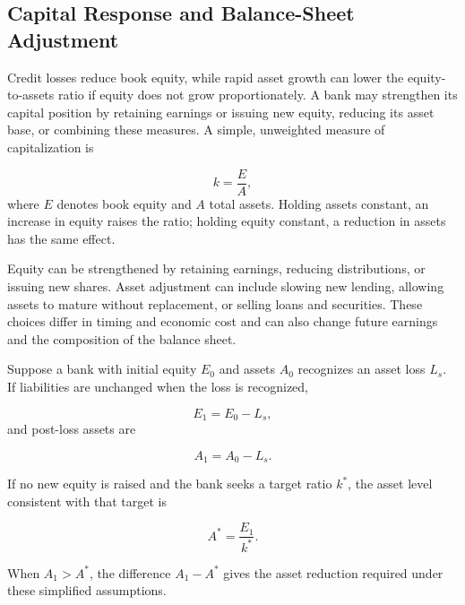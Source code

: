 \subsection[Capital Response and Balance-Sheet Adjustment]
{Capital Response and Balance-Sheet Adjustment}

Credit losses reduce book equity, while rapid asset growth
can lower the equity-to-assets ratio if equity does not grow
proportionately. A bank may strengthen its capital position
by retaining earnings or issuing new equity, reducing its
asset base, or combining these measures. A simple,
unweighted measure of capitalization is

\begin{equation}
k=\frac{E}{A},
\end{equation}
where $E$ denotes book equity and $A$ total assets.
Holding assets constant, an increase in equity raises the
ratio; holding equity constant, a reduction in assets has
the same effect.

Equity can be strengthened by retaining earnings, reducing distributions, or issuing new shares. Asset adjustment can include slowing new lending, allowing assets to mature without replacement, or selling loans and securities. These choices differ in timing and economic cost and can also change future earnings and the composition of the balance sheet.

Suppose a bank with initial equity $E_0$ and assets $A_0$ recognizes an asset loss $L_s$. If liabilities are unchanged when the loss is recognized,

\begin{equation}
E_1=E_0-L_s,
\label{eq:ch12-capital-after-loss}
\end{equation}
and post-loss assets are

\begin{equation}
A_1=A_0-L_s.
\end{equation}

If no new equity is raised and the bank seeks a target ratio $k^{*}$, the asset level consistent with that target is

\begin{equation}
A^{*}=\frac{E_1}{k^{*}}.
\label{eq:ch12-assets-consistent-capital-ratio}
\end{equation}

When $A_1>A^{*}$, the difference $A_1-A^{*}$ gives the asset reduction required under these simplified assumptions.

